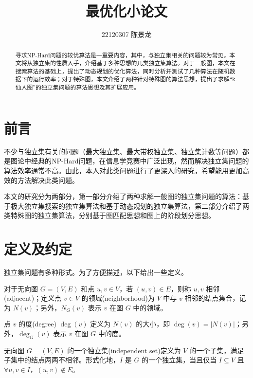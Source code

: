 \documentclass[lang=cn,11pt,a4paper]{elegantpaper}
\title{最优化小论文}
\author{22120307 陈景龙}
\institute{北京交通大学}
\date{\zhtoday}
\begin{document}
\maketitle

\begin{abstract}
    寻求NP-Hard问题的较优算法是一重要内容，其中，与独立集相关的问题较为常见。本文将从独立集的性质入手，介绍基于多种思想的几类独立集算法。对于一般图，本文在搜索算法的基础上，提出了动态规划的优化算法，同时分析并测试了几种算法在随机数据下的运行效率；对于特殊图，本文介绍了两种针对特殊图的算法思想，提出了求解“k-仙人图”的独立集问题的算法思想及其扩展应用。

\end{abstract}

\newpage
{} 
\tableofcontents
\newpage

\section{前言}
不少与独立集有关的问题（最大独立集、最大带权独立集、独立集计数等问题）都是图论中经典的NP-Hard问题，在信息学竞赛中广泛出现，然而解决独立集问题的算法效率通常不高。由此，本人对此类问题进行了更深入的研究，希望能用更加高效的方法解决此类问题。

本文的研究分为两部分，第一部分介绍了两种求解一般图的独立集问题的算法：基于极大独立集搜索的独立集算法和基于动态规划的独立集算法，第二部分介绍了两类特殊图的独立集算法，分别基于图匹配思想和图上的阶段划分思想。

\section{定义及约定}
独立集问题有多种形式。为了方便描述，以下给出一些定义。
\begin{definition}
    对于无向图 $G = (V, E)$ 和点 $u, v \in V$，若 $(u, v) \in E$，则称 $u, v$ 相邻(adjacent)；定义点 $v \in V$ 的领域(neighborhood)为 $V$ 中与 $v$ 相邻的结点集合，记为 $N(v)$；另外，$N_G(v)$ 表示 $v$ 在图 $G$ 中的领域。
\end{definition}

\begin{definition}
    点 $v$ 的度(degree) $\deg(v)$ 定义为 $N(v)$ 的大小，即 $\deg(v) = |N(v)|$；另外，$\deg_G(v)$ 表示 $v$ 在图 $G$ 中的度。
\end{definition}

\begin{definition}
    无向图 $G = (V, E)$ 的一个独立集(independent set)定义为 $V$ 的一个子集，满足子集中的结点两两不相邻。形式化地，$I$ 是 $G$ 的一个独立集，当且仅当 $I \subseteq V$ 且 $\forall u, v \in I$，$(u, v) \notin E$。
\end{definition}
\end{document}
